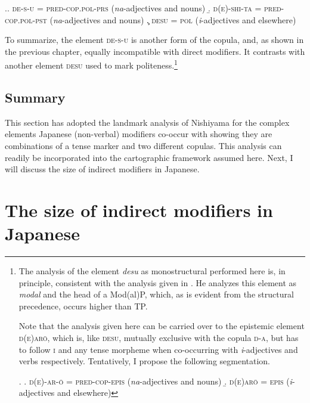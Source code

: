 \documentclass [output=book,colorlinks,citecolor=brown]{langscibook}
\begin{document}
\ex.\a. \textsc{de-s-u} = \textsc{pred-cop.pol-prs} (\textit{na}-adjectives and nouns)
\b. \textsc{d(e)-shi-ta} = \textsc{pred-cop.pol-pst} (\textit{na}-adjectives and nouns)
\c. \textsc{desu} = \textsc{pol} (\textit{i}-adjectives and elsewhere)

To summarize, the element \textsc{de-s-u} is another form of the copula, and, as shown in the previous chapter, equally incompatible with direct modifiers. It contrasts with another element \textsc{desu} used to mark politeness.\footnote{The analysis of the element \textit{desu} as monostructural performed here is, in principle, consistent with the analysis given in \citet[64–67]{miyagawa:2022:syntax}. He analyzes this element as \textit{modal} and the head of a Mod(al)P, which, as is evident from the structural precedence, occurs higher than TP.

\par

Note that the analysis given here can be carried over to the epistemic element \textsc{d(e)arō}, which is, like \textsc{desu}, mutually exclusive with the copula \textsc{d-a}, but has to follow \textsc{i} and any tense morpheme when co-occurring with \textit{i}-adjectives and verbs respectively. Tentatively, I propose the following segmentation.

\par


\ex. \a. \textsc{d(e)-ar-ō} = \textsc{pred-cop-epis} (\textit{na}-adjectives and nouns)
\b. \textsc{d(e)arō} = \textsc{epis} (\textit{i}-adjectives and elsewhere)

\par

} %

 \subsection{Summary}

This section has adopted the landmark analysis of Nishiyama for the complex elements Japanese (non-verbal) modifiers co-occur with showing they are combinations of a tense marker and two different copulas. This analysis can readily be incorporated into the cartographic framework assumed here. Next, I will discuss the size of indirect modifiers in Japanese.

\section{The size of indirect modifiers in Japanese} \label{size,indirect}
\end{document}
